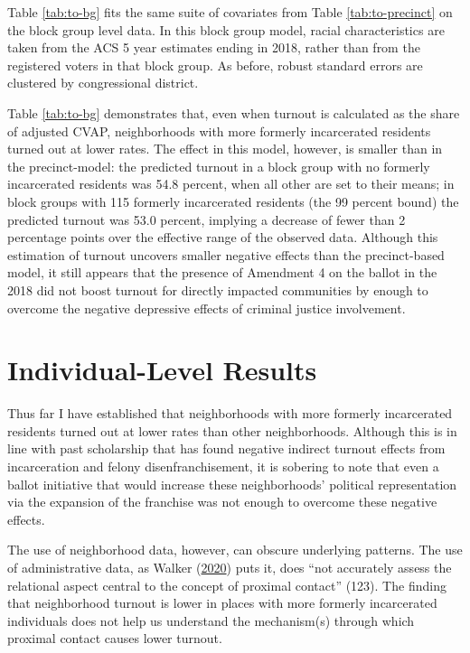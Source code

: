\documentclass[
  12pt,
]{article}
\begin{document}
Table \ref{tab:to-bg} fits the same suite of covariates from Table \ref{tab:to-precinct} on the block group level data. In this block group model, racial characteristics are taken from the ACS 5 year estimates ending in 2018, rather than from the registered voters in that block group. As before, robust standard errors are clustered by congressional district.

\begin{singlespace}


\end{singlespace}

Table \ref{tab:to-bg} demonstrates that, even when turnout is calculated as the share of adjusted CVAP, neighborhoods with more formerly incarcerated residents turned out at lower rates. The effect in this model, however, is smaller than in the precinct-model: the predicted turnout in a block group with no formerly incarcerated residents was 54.8 percent, when all other are set to their means; in block groups with 115 formerly incarcerated residents (the 99 percent bound) the predicted turnout was 53.0 percent, implying a decrease of fewer than 2 percentage points over the effective range of the observed data. Although this estimation of turnout uncovers smaller negative effects than the precinct-based model, it still appears that the presence of Amendment 4 on the ballot in the 2018 did not boost turnout for directly impacted communities by enough to overcome the negative depressive effects of criminal justice involvement.

\hypertarget{individual-level-results}{%
\section*{Individual-Level Results}\label{individual-level-results}}

Thus far I have established that neighborhoods with more formerly incarcerated residents turned out at lower rates than other neighborhoods. Although this is in line with past scholarship that has found negative indirect turnout effects from incarceration and felony disenfranchisement, it is sobering to note that even a ballot initiative that would increase these neighborhoods' political representation via the expansion of the franchise was not enough to overcome these negative effects.

The use of neighborhood data, however, can obscure underlying patterns. The use of administrative data, as Walker (\protect\hyperlink{ref-Walker2020}{2020}) puts it, does ``not accurately assess the relational aspect central to the concept of proximal contact'' (123). The finding that neighborhood turnout is lower in places with more formerly incarcerated individuals does not help us understand the mechanism(s) through which proximal contact causes lower turnout.
\end{document}
